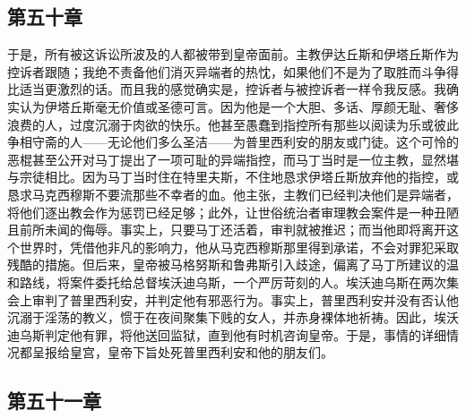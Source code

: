 
\subsection{第五十章}

于是，所有被这诉讼所波及的人都被带到皇帝面前。主教伊达丘斯和伊塔丘斯作为控诉者跟随；我绝不责备他们消灭异端者的热忱，如果他们不是为了取胜而斗争得比适当更激烈的话。而且我的感觉确实是，控诉者与被控诉者一样令我反感。我确实认为伊塔丘斯毫无价值或圣德可言。因为他是一个大胆、多话、厚颜无耻、奢侈浪费的人，过度沉溺于肉欲的快乐。他甚至愚蠢到指控所有那些以阅读为乐或彼此争相守斋的人——无论他们多么圣洁——为普里西利安的朋友或门徒。这个可怜的恶棍甚至公开对马丁提出了一项可耻的异端指控，而马丁当时是一位主教，显然堪与宗徒相比。因为马丁当时住在特里夫斯，不住地恳求伊塔丘斯放弃他的指控，或恳求马克西穆斯不要流那些不幸者的血。他主张，主教们已经判决他们是异端者，将他们逐出教会作为惩罚已经足够；此外，让世俗统治者审理教会案件是一种丑陋且前所未闻的侮辱。事实上，只要马丁还活着，审判就被推迟；而当他即将离开这个世界时，凭借他非凡的影响力，他从马克西穆斯那里得到承诺，不会对罪犯采取残酷的措施。但后来，皇帝被马格努斯和鲁弗斯引入歧途，偏离了马丁所建议的温和路线，将案件委托给总督埃沃迪乌斯，一个严厉苛刻的人。埃沃迪乌斯在两次集会上审判了普里西利安，并判定他有邪恶行为。事实上，普里西利安并没有否认他沉溺于淫荡的教义，惯于在夜间聚集下贱的女人，并赤身裸体地祈祷。因此，埃沃迪乌斯判定他有罪，将他送回监狱，直到他有时机咨询皇帝。于是，事情的详细情况都呈报给皇宫，皇帝下旨处死普里西利安和他的朋友们。\par


\subsection{第五十一章}

